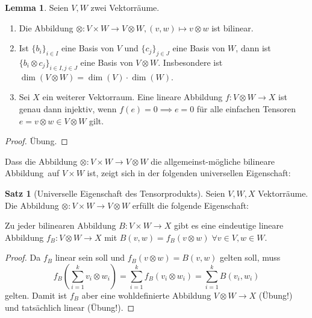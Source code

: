 \documentclass[a4paper]{scrreprt}
\numberwithin{equation}{chapter}
\theoremstyle{definition}
\newtheorem{lemma}[defn]{Lemma}
\newtheorem{satz}[defn]{Satz}
\newcommand{\bewUeb}{\begin{proof}Übung.\end{proof}}
\begin{document}
\begin{lemma} \label{lemma:tensor_prod}
	Seien $V,W$ zwei Vektorräume.
	\begin{enumerate}[label=(\alph*)]
		\item Die Abbildung $\otimes\colon V\times W\to V\otimes W, (v,w) \mapsto v\otimes w$ ist bilinear.
		\item Ist $\{b_i\}_{i\in I}$ eine Basis von $V$ und $\{c_j\}_{j\in J}$ eine Basis von $W$, dann ist $\{b_i \otimes c_j\}_{i\in I, j\in J}$ eine Basis von $V\otimes W$. Insbesondere ist $\dim(V\otimes W) = \dim(V) \cdot \dim(W)$.
		\item \label{item:tensor_prod_inj} Sei $X$ ein weiterer Vektorraum. Eine lineare Abbildung $f\colon V\otimes W \to X$ ist genau dann injektiv, wenn $f(e) = 0 \implies e = 0$ für alle einfachen Tensoren $e = v\otimes w \in V\otimes W$ gilt.
	\end{enumerate}
	\bewUeb
\end{lemma}
Dass die Abbildung $\otimes\colon V\times W \to V\otimes W$ die \glqq allgemeinst-mögliche bilineare Abbildung\grqq\ auf $V\times W$ ist, zeigt sich in der folgenden universellen Eigenschaft:
\begin{satz}[Universelle Eigenschaft des Tensorprodukts]
	Seien $V,W,X$ Vektorräume. Die Abbildung $\otimes\colon V\times W \to V\otimes W$ erfüllt die folgende Eigenschaft:

	Zu jeder bilinearen Abbildung $B\colon V\times W \to X$ gibt es eine eindeutige lineare Abbildung $f_B\colon V\otimes W \to X$ mit $B(v,w) = f_B(v\otimes w) \; \forall v\in V, w\in W$.

	\begin{center}
	\end{center}

	\begin{proof}
		Da $f_B$ linear sein soll und $f_B(v\otimes w) = B(v,w)$ gelten soll, muss
		\[f_B\left(\sum_{i=1}^k v_i \otimes w_i\right) = \sum_{i=1}^k f_B(v_i \otimes w_i) = \sum_{i=1}^k B(v_i,w_i)\]
		gelten. Damit ist $f_B$ aber eine wohldefinierte Abbildung $V\otimes W \to X$ (Übung!) und tatsächlich linear (Übung!).
	\end{proof}
\end{satz}
\end{document}

